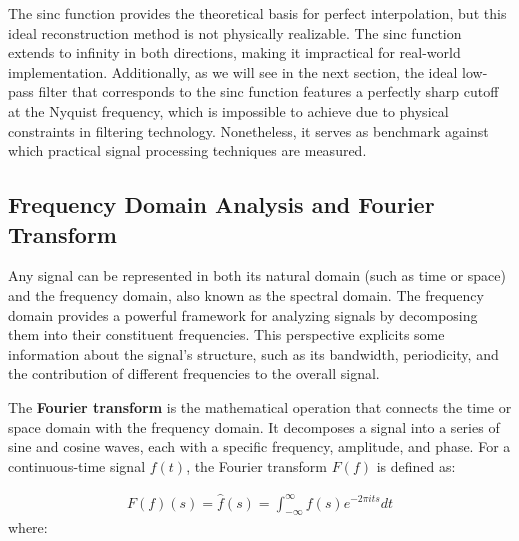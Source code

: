 The sinc function provides the theoretical basis for perfect interpolation, but this ideal reconstruction method is not physically realizable. The sinc function extends to infinity in both directions, making it impractical for real-world implementation. Additionally, as we will see in the next section, the ideal low-pass filter that corresponds to the sinc function features a perfectly sharp cutoff at the Nyquist frequency, which is impossible to achieve due to physical constraints in filtering technology. Nonetheless, it serves as benchmark against which practical signal processing techniques are measured.





\subsection{Frequency Domain Analysis and Fourier Transform}

Any signal can be represented in both its natural domain (such as time or space) and the frequency domain, also known as the spectral domain. The frequency domain provides a powerful framework for analyzing signals by decomposing them into their constituent frequencies. This perspective explicits some information about the signal's structure, such as its bandwidth, periodicity, and the contribution of different frequencies to the overall signal.

The \textbf{Fourier transform} is the mathematical operation that connects the time or space domain with the frequency domain. It decomposes a signal into a series of sine and cosine waves, each with a specific frequency, amplitude, and phase. For a continuous-time signal \( f(t) \), the Fourier transform \( F(f) \) is defined as:

\begin{align}
  F(f)(s) = \hat{f}(s) = \int_{-\infty}^{\infty} f(s) e^{-2\pi i t s} dt
\end{align}
where:

